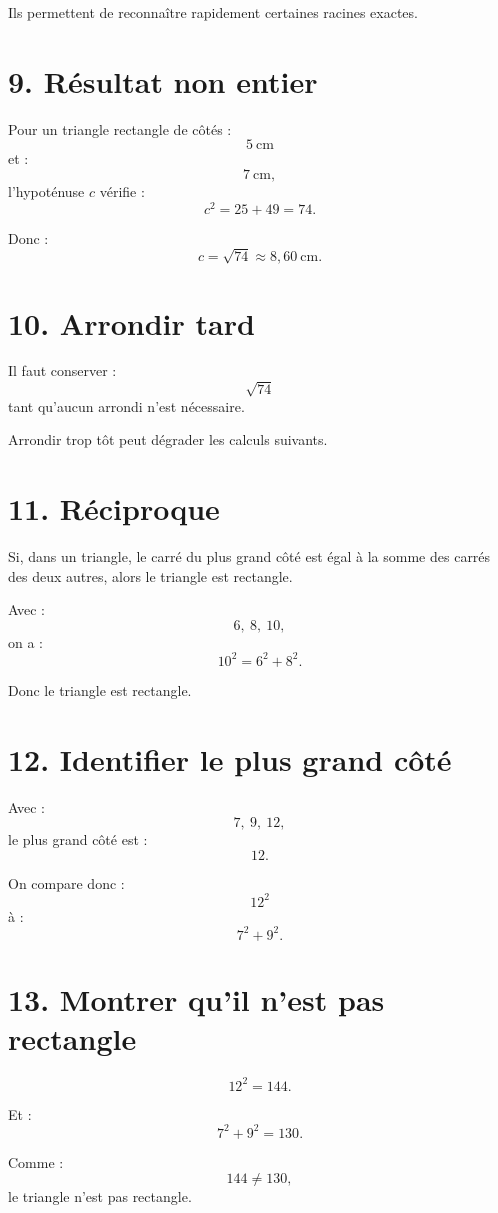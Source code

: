 Ils permettent de reconnaître rapidement certaines racines exactes.

\section{9. Résultat non entier}

Pour un triangle rectangle de côtés :
\[
5\ \text{cm}
\]
et :
\[
7\ \text{cm},
\]
l'hypoténuse $c$ vérifie :
\[
c^2=25+49=74.
\]

Donc :
\[
c=\sqrt{74}\approx8{,}60\ \text{cm}.
\]

\section{10. Arrondir tard}

Il faut conserver :
\[
\sqrt{74}
\]
tant qu'aucun arrondi n'est nécessaire.

Arrondir trop tôt peut dégrader les calculs suivants.

\section{11. Réciproque}

\begin{propriete}
Si, dans un triangle, le carré du plus grand côté est égal à la somme des carrés des deux autres, alors le triangle est rectangle.
\end{propriete}

Avec :
\[
6,\ 8,\ 10,
\]
on a :
\[
10^2=6^2+8^2.
\]

Donc le triangle est rectangle.

\section{12. Identifier le plus grand côté}

Avec :
\[
7,\ 9,\ 12,
\]
le plus grand côté est :
\[
12.
\]

On compare donc :
\[
12^2
\]
à :
\[
7^2+9^2.
\]

\section{13. Montrer qu'il n'est pas rectangle}

\[
12^2=144.
\]

Et :
\[
7^2+9^2=130.
\]

Comme :
\[
144\neq130,
\]
le triangle n'est pas rectangle.

